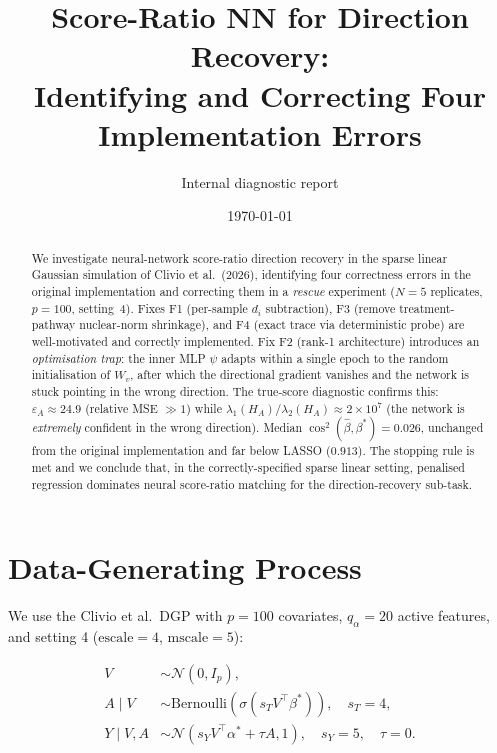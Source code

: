 \documentclass[11pt]{article}
\title{Score-Ratio NN for Direction Recovery:\\
       Identifying and Correcting Four Implementation Errors}
\author{Internal diagnostic report}
\date{\today}
\begin{document}
\maketitle

\begin{abstract}
We investigate neural-network score-ratio direction recovery in the sparse linear
Gaussian simulation of Clivio et al.~(2026), identifying four correctness errors
in the original implementation and correcting them in a \emph{rescue} experiment
($N=5$ replicates, $p=100$, setting~4).
Fixes F1 (per-sample $d_i$ subtraction), F3 (remove treatment-pathway nuclear-norm
shrinkage), and F4 (exact trace via deterministic probe) are well-motivated and
correctly implemented.
Fix F2 (rank-1 architecture) introduces an \emph{optimisation trap}: the inner MLP
$\psi$ adapts within a single epoch to the random initialisation of $W_v$, after
which the directional gradient vanishes and the network is stuck pointing in the
wrong direction.  The true-score diagnostic confirms this:
$\varepsilon_A \approx 24.9$ (relative MSE $\gg 1$) while $\lambda_1(H_A)/\lambda_2(H_A)\approx 2\times 10^7$
(the network is \emph{extremely} confident in the wrong direction).
Median $\cos^2(\hat\beta,\beta^*)=0.026$, unchanged from the original implementation
and far below LASSO ($0.913$).  The stopping rule is met and we conclude that,
in the correctly-specified sparse linear setting, penalised regression dominates
neural score-ratio matching for the direction-recovery sub-task.
\end{abstract}

\section{Data-Generating Process}

We use the Clivio et al.\ DGP with $p=100$ covariates, $q_\alpha = 20$
active features, and setting 4 ($\text{escale}=4$, $\text{mscale}=5$):

\begin{align*}
V &\sim \mathcal{N}(0,I_{p}),\\
A\mid V &\sim \mathrm{Bernoulli}\!\left(\sigma\!\left(s_T V^\top\beta^*\right)\right),
  \quad s_T=4,\\
Y\mid V,A &\sim \mathcal{N}\!\left(s_Y V^\top\alpha^*+\tau A,1\right),
  \quad s_Y=5,\quad\tau=0.
\end{align*}
\end{document}
